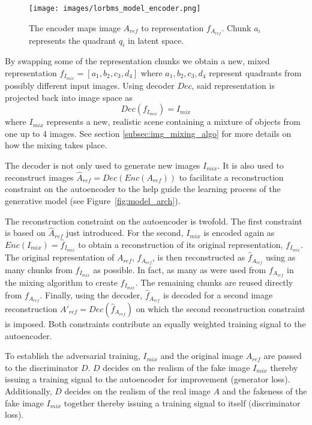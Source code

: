 \documentclass[a4paper,12pt]{report}
\begin{document}
\begin{figure}[ht]
\centering
\texttt{[image: images/lorbms\_model\_encoder.png]}
\caption{The encoder maps image $A_{ref}$ to representation $f_{A_{ref}}$. Chunk $a_i$ represents the quadrant $q_i$ in latent space.}
\label{fig:encoder}
\end{figure}

By swapping some of the representation chunks we obtain a new, mixed representation $f_{I_{mix}} = [a_1, b_2, c_3, d_4]$ where $a_1,b_2,c_3,d_4$ represent quadrants from possibly different input images. Using decoder $Dec$, said representation is projected back into image space as
\begin{equation} \label{eq:3}
    Dec(f_{I_{mix}}) = I_{mix}
\end{equation}
where $I_{mix}$ represents a new, realistic scene containing a mixture of objects from one up to 4 images. See section \ref{subsec:img_mixing_algo} for more details on how the mixing takes place.

The decoder is not only used to generate new images $I_{mix}$. It is also used to reconstruct images $\hat{A}_{ref} = Dec(Enc(A_{ref}))$ to facilitate a reconstruction constraint on the autoencoder to the help guide the learning process of the generative model (see Figure~\ref{fig:model_arch}).

The reconstruction constraint on the autoencoder is twofold. The first constraint is based on $\hat{A}_{ref}$ just introduced. For the second, $I_{mix}$ is encoded again as $Enc(I_{mix}) = \hat{f}_{I_{mix}}$ to obtain a reconstruction of its original representation, $f_{I_{mix}}$. The original representation of $A_{ref}$, $f_{A_{ref}}$, is then reconstructed as $\hat{f}_{A_{ref}}$ using as many chunks from $\hat{f}_{I_{mix}}$ as possible. In fact, as many as were used from $f_{A_{ref}}$ in the mixing algorithm to create $f_{I_{mix}}$. The remaining chunks are reused directly from $f_{A_{ref}}$. Finally, using the decoder, $\hat{f}_{A_{ref}}$ is decoded for a second image reconstruction $A'_{ref} = Dec(\hat{f}_{A_{ref}})$ on which the second reconstruction constraint is imposed. Both constraints contribute an equally weighted training signal to the autoencoder.

To establish the adversarial training, $I_{mix}$ and the original image $A_{ref}$ are passed to the discriminator $D$. $D$ decides on the realism of the fake image $I_{mix}$ thereby issuing a training signal to the autoencoder for improvement (generator loss). Additionally, $D$ decides on the realism of the real image $A$ and the fakeness of the fake image $I_{mix}$ together thereby issuing a training signal to itself (discriminator loss).
\end{document}
